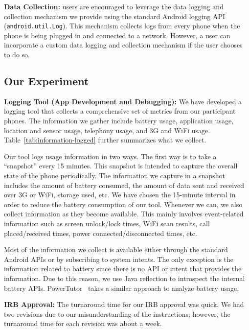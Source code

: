 {\bf Data Collection:} \PhoneLab{} users are encouraged to leverage the data
logging and collection mechanism we provide using the standard Android logging
API (\texttt{android.util.Log}). This mechanism collects logs from every phone
when the phone is being plugged in and connected to a network. However, a
\PhoneLab{} user can incorporate a custom data logging and collection mechanism
if the user chooses to do so.



\subsection{Our Experiment}

{\bf Logging Tool (App Development and Debugging):} We have developed a logging
tool that collects a comprehensive set of metrics from our participant phones.
The information we gather include battery usage, application usage, location and
sensor usage, telephony usage, and 3G and WiFi usage.
Table~\ref{tab:information-logged} further summarizes what we collect.

Our tool logs usage information in two ways. The first way is to take a
``snapshot'' every 15 minutes. This snapshot is intended to capture the overall
state of the phone periodically. The information we capture in a snapshot
includes the amount of battery consumed, the amount of data sent and received
over 3G or WiFi, storage used, etc. We have chosen the 15-minute interval in
order to reduce the battery consumption of our tool. Whenever we can, we also collect information
as they become available. This mainly involves event-related information such as
screen unlock/lock times, WiFi scan results, call placed/received times, power
connected/disconnected times, etc.

Most of the information we collect is available either through the standard
Android APIs or by subscribing to system intents. The only exception is
the information related to battery since there is no API or intent that provides
the information. Due to this reason, we use Java reflection to introspect the
internal battery APIs. PowerTutor~\cite{zhang:codes:2010} takes a similar
approach to analyze battery usage.

{\bf IRB Approval:} The turnaround time for our IRB approval
was quick. We had two revisions due to our misunderstanding of the instructions;
however, the turnaround time for each revision was about a week.

